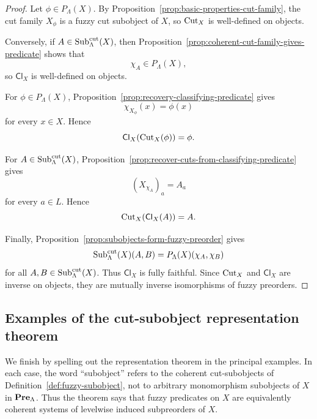 \begin{proof}
    Let \(\phi\in P_\Lambda(X)\). By Proposition~\ref{prop:basic-properties-cut-family}, the cut family \(X_\phi\) is a fuzzy cut subobject of \(X\), so \(\mathrm{Cut}_X\) is well-defined on objects.

    Conversely, if \(A\in\mathrm{Sub}^{\mathrm{cut}}_\Lambda(X)\), then Proposition~\ref{prop:coherent-cut-family-gives-predicate} shows that
    \[
        \chi_A\in P_\Lambda(X),
    \]
    so \(\mathsf{Cl}_X\) is well-defined on objects.

    For \(\phi\in P_\Lambda(X)\), Proposition~\ref{prop:recovery-classifying-predicate} gives
    \[
        \chi_{X_\phi}(x)=\phi(x)
    \]
    for every \(x\in X\). Hence
    \[
        \mathsf{Cl}_X(\mathrm{Cut}_X(\phi))=\phi.
    \]

    For \(A\in\mathrm{Sub}^{\mathrm{cut}}_\Lambda(X)\), Proposition~\ref{prop:recover-cuts-from-classifying-predicate} gives
    \[
        (X_{\chi_A})_a=A_a
    \]
    for every \(a\in L\). Hence
    \[
        \mathrm{Cut}_X(\mathsf{Cl}_X(A))=A.
    \]

    Finally, Proposition~\ref{prop:subobjects-form-fuzzy-preorder} gives
    \[
        \mathrm{Sub}^{\mathrm{cut}}_\Lambda(X)(A,B)
        =
        P_\Lambda(X)(\chi_A,\chi_B)
    \]
    for all \(A,B\in\mathrm{Sub}^{\mathrm{cut}}_\Lambda(X)\). Thus \(\mathsf{Cl}_X\) is fully faithful. Since \(\mathrm{Cut}_X\) and \(\mathsf{Cl}_X\) are inverse on objects, they are mutually inverse isomorphisms of fuzzy preorders.
\end{proof}

\subsection{Examples of the cut-subobject representation theorem}
\label{subsec:examples-cut-subobject-representation}

We finish by spelling out the representation theorem in the principal examples. In each case, the word ``subobject'' refers to the coherent cut-subobjects of Definition~\ref{def:fuzzy-subobject}, not to arbitrary monomorphism subobjects of \(X\) in \(\mathbf{Pre}_\Lambda\). Thus the theorem says that fuzzy predicates on \(X\) are equivalently coherent systems of levelwise induced subpreorders of \(X\).

